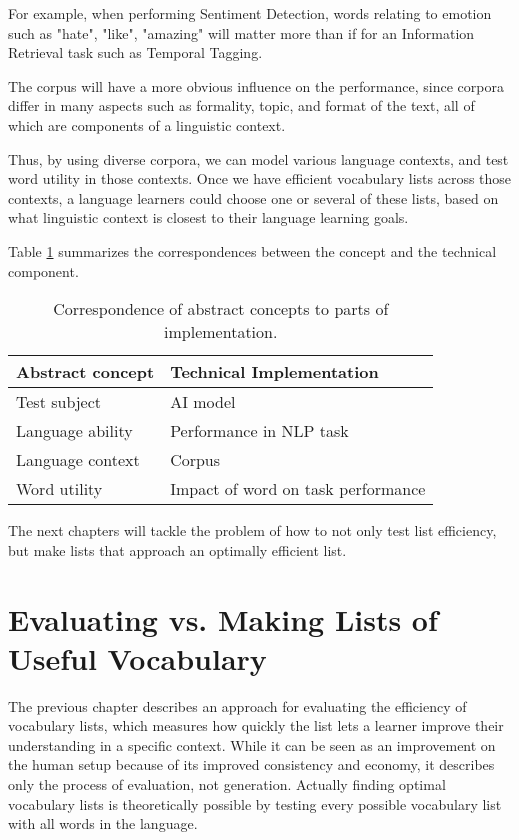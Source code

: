 For example, when performing Sentiment Detection, words relating to emotion such as "hate", "like", "amazing" will matter more than if for an Information Retrieval task such as Temporal Tagging.

The corpus will have a more obvious influence on the performance, since corpora differ in many aspects such as formality, topic, and format of the text, all of which are components of a linguistic context.

Thus, by using diverse corpora, we can model various language contexts, and test word utility in those contexts.
Once we have efficient vocabulary lists across those contexts, a language learners could choose one or several of these lists, based on what linguistic context is closest to their language learning goals.


Table \ref{table:concept-implementation-correspondence} summarizes the correspondences between the concept and the technical component.

\begin{table}[ht]
	\centering
	\begin{tabularx}{\textwidth}{|X|X|}
		\hline
		\textbf{Abstract concept} & \textbf{Technical Implementation}  \\
		\hline
		Test subject              & AI model                           \\
		\hline
		Language ability          & Performance in NLP task            \\
		\hline
		Language context          & Corpus                             \\
		\hline
		Word utility              & Impact of word on task performance \\
		\hline
	\end{tabularx}
	\caption{Correspondence of abstract concepts to parts of implementation.}
	\label{table:concept-implementation-correspondence}
\end{table}

The next chapters will tackle the problem of how to not only test list efficiency, but make lists that approach an optimally efficient list.

\section{Evaluating vs. Making Lists of Useful Vocabulary} \label{sec:eval-vs-creation}
The previous chapter describes an approach for evaluating the efficiency of vocabulary lists, which measures how quickly the list lets a learner improve their understanding in a specific context.
While it can be seen as an improvement on the human setup because of its improved consistency and economy, it describes only the process of evaluation, not generation.
Actually finding optimal vocabulary lists is theoretically possible by testing every possible vocabulary list with all words in the language.

